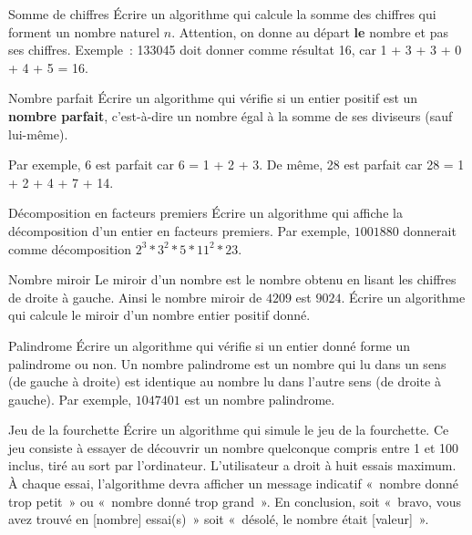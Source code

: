 	\begin{Exercice}{Somme de chiffres}
		Écrire un algorithme qui calcule la somme des chiffres qui forment un
		nombre naturel $n$. Attention, on donne au départ \textbf{le} nombre et
		pas ses chiffres. Exemple~: 133045 doit donner comme résultat 16,
		car 1 + 3 + 3 + 0 + 4 + 5 = 16.
	\end{Exercice}
	
	\begin{Exercice}{Nombre parfait}
		Écrire un algorithme qui vérifie si un entier positif est un
		\textbf{nombre parfait}, c’est-à-dire un nombre égal à la somme de ses
		diviseurs (sauf lui-même). 
		
		Par exemple, 6 est parfait car 6 = 1 + 2 + 3. 
		De même, 28 est parfait car 28 = 1 + 2 + 4 + 7 + 14.
	\end{Exercice}
	
	\begin{Exercice}{Décomposition en facteurs premiers}
		Écrire un algorithme qui affiche la décomposition 
		d’un entier en facteurs premiers. 
		Par exemple, $1001880$ donnerait comme décomposition
		$2^3 * 3^2 * 5 * 11^2 * 23$.
	\end{Exercice}

	\begin{Exercice}{Nombre miroir}
		Le miroir d’un nombre est le nombre obtenu
		en lisant les chiffres de droite à gauche.
		Ainsi le nombre miroir de $4209$ est $9024$.
		Écrire un algorithme qui calcule le miroir
		d’un nombre entier positif donné.
	\end{Exercice}
	
	\begin{Exercice}{Palindrome}
		Écrire un algorithme qui vérifie si un entier donné 
		forme un palindrome ou non. 
		Un nombre palindrome est un nombre qui lu dans un sens 
		(de gauche à droite) est identique au nombre lu dans l’autre sens 
		(de droite à gauche). 
		Par exemple, $1047401$ est un nombre palindrome.
	\end{Exercice}
	
	\begin{Exercice}{Jeu de la fourchette}
		Écrire un algorithme qui simule le jeu de la
		fourchette. Ce jeu consiste à essayer de découvrir un nombre quelconque
		compris entre 1 et 100 inclus, tiré au sort par l’ordinateur. 
		L’utilisateur a droit à huit essais
		maximum. À chaque essai, l’algorithme devra afficher un message
		indicatif «~nombre donné trop petit~» ou «~nombre donné trop grand~».
		En conclusion, soit «~bravo, vous avez trouvé en [nombre] essai(s)~» soit
		«~désolé, le nombre était [valeur]~».
	\end{Exercice}
	

